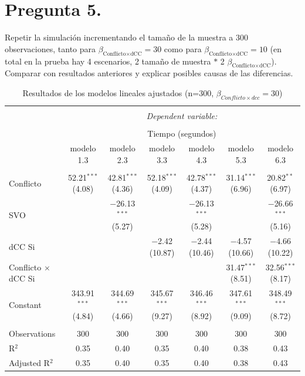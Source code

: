 \documentclass[
  spanish,
  10pt,
]{article}
\begin{document}
\section{Pregunta 5.}\label{pregunta-5.}

Repetir la simulación incrementando el tamaño de la muestra a 300
observaciones, tanto para
\(\beta_{\text{Conflicto} \times \text{dCC}} = 30\) como para
\(\beta_{\text{Conflicto} \times \text{dCC}} = 10\) (en total en la
prueba hay 4 escenarios, 2 tamaño de muestra \(\ast\) 2
\(\beta_{\text{Conflicto} \times \text{dCC}}\)). Comparar con resultados
anteriores y explicar posibles causas de las diferencias.

\begin{table}[H] \centering 
  \caption{Resultados de los modelos lineales ajustados (n=300, $\beta_{Conflicto \times dcc} = 30$)} 
  \label{} 
\tiny 
\begin{tabular}{@{\extracolsep{5pt}}lcccccc} 
\\[-1.8ex]\hline 
\hline \\[-1.8ex] 
 & \multicolumn{6}{c}{\textit{Dependent variable:}} \\ 
\cline{2-7} 
\\[-1.8ex] & \multicolumn{6}{c}{Tiempo (segundos)} \\ 
 & modelo 1.3 & modelo 2.3 & modelo 3.3 & modelo 4.3 & modelo 5.3 & modelo 6.3 \\ 
\hline \\[-1.8ex] 
 Conflicto & 52.21$^{***}$ (4.08) & 42.81$^{***}$ (4.36) & 52.18$^{***}$ (4.09) & 42.78$^{***}$ (4.37) & 31.14$^{***}$ (6.96) & 20.82$^{**}$ (6.97) \\ 
  SVO &  & $-$26.13$^{***}$ (5.27) &  & $-$26.13$^{***}$ (5.28) &  & $-$26.66$^{***}$ (5.16) \\ 
  dCC Si &  &  & $-$2.42 (10.87) & $-$2.44 (10.46) & $-$4.57 (10.66) & $-$4.66 (10.22) \\ 
  Conflicto $\times$ dCC Si &  &  &  &  & 31.47$^{***}$ (8.51) & 32.56$^{***}$ (8.17) \\ 
  Constant & 343.91$^{***}$ (4.84) & 344.69$^{***}$ (4.66) & 345.67$^{***}$ (9.27) & 346.46$^{***}$ (8.92) & 347.61$^{***}$ (9.09) & 348.49$^{***}$ (8.72) \\ 
 \hline \\[-1.8ex] 
Observations & 300 & 300 & 300 & 300 & 300 & 300 \\ 
R$^{2}$ & 0.35 & 0.40 & 0.35 & 0.40 & 0.38 & 0.43 \\ 
Adjusted R$^{2}$ & 0.35 & 0.40 & 0.35 & 0.40 & 0.38 & 0.43 \\ 

\end{tabular}
\end{table}
\end{document}
